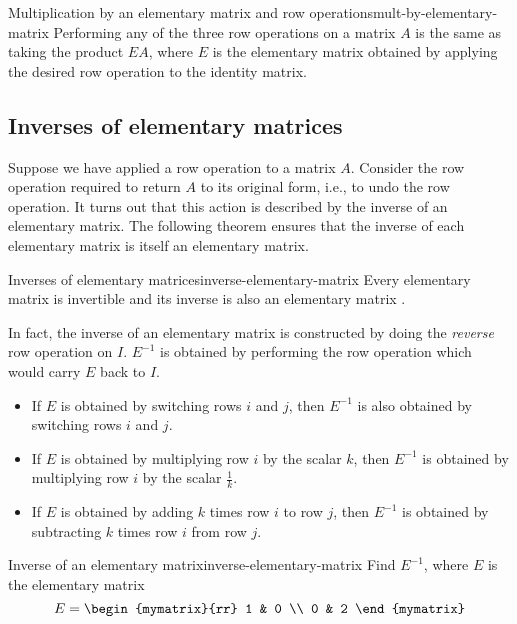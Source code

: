 \begin{theorem}{Multiplication by an elementary matrix and row operations}{mult-by-elementary-matrix}
  Performing any of the three row operations on a matrix $A$ is the
  same as taking the product $EA$, where $E$ is the elementary matrix
  obtained by applying the desired row operation to the identity
  matrix.
\end{theorem}

\subsection{Inverses of elementary matrices}

Suppose we have applied a row operation to a matrix $A$. Consider the
row operation required to return $A$ to its original form, i.e., to
undo the row operation. It turns out that this action is described by
the inverse of an elementary matrix. The following theorem ensures
that the inverse of each elementary matrix is itself an elementary
matrix.

\begin{theorem}{Inverses of elementary matrices}{inverse-elementary-matrix}
  Every elementary matrix is invertible and its inverse is also an
  elementary matrix%
  .
\end{theorem}

In fact, the inverse of an elementary matrix is constructed by doing
the {\em reverse }row operation on $I$. $E^{-1}$ is obtained by
performing the row operation which would carry $E$ back to $I$.

\begin{itemize}
\item If $E$ is obtained by switching rows $i$ and $j$, then $E^{-1}$
  is also obtained by switching rows $i$ and $j$.
\item If $E$ is obtained by multiplying row $i$ by the scalar $k$,
  then $E^{-1}$ is obtained by multiplying row $i$ by the scalar
  $\frac{1}{k}$.
\item If $E$ is obtained by adding $k$ times row $i$ to row $j$, then
  $E^{-1}$ is obtained by subtracting $k$ times row $i$ from row $j$.
\end{itemize}

\begin{example}{Inverse of an elementary matrix}{inverse-elementary-matrix}
  Find $E^{-1}$, where $E$ is the elementary matrix
  \begin{equation*}
    E
    =
    \begin{mymatrix}{rr}
      1 & 0 \\
      0 & 2
    \end{mymatrix}
  \end{equation*}
\end{example}

